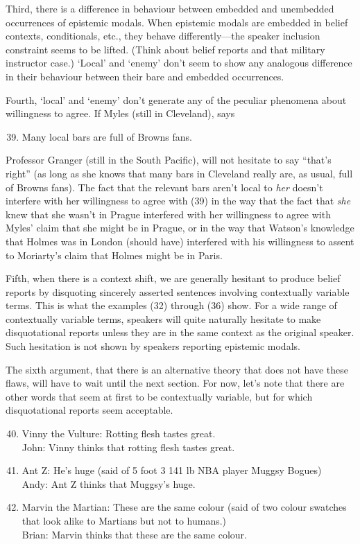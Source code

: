 Third, there is a difference in behaviour between embedded and unembedded occurrences of epistemic modals. When epistemic modals are embedded in belief contexts, conditionals, etc., they behave differently---the speaker inclusion constraint seems to be lifted. (Think about belief reports and that military instructor case.) `Local' and `enemy' don't seem to show any analogous difference in their behaviour between their bare and embedded occurrences.
 
Fourth, `local' and `enemy' don't generate any of the peculiar phenomena about willingness to agree. If Myles (still in Cleveland), says 
 
\begin{enumerate}
\setcounter{enumi}{38} 
\item Many local bars are full of Browns fans.
\end{enumerate}

\noindent Professor Granger (still in the South Pacific), will not hesitate to say ``that's right'' (as long as she knows that many bars in Cleveland really are, as usual, full of Browns fans). The fact that the relevant bars aren't local to \textit{her} doesn't interfere with her willingness to agree with (39) in the way that the fact that \textit{she} knew that she wasn't in Prague interfered with her willingness to agree with Myles' claim that she might be in Prague, or in the way that Watson's knowledge that Holmes was in London (should have) interfered with his willingness to assent to Moriarty's claim that Holmes might be in Paris. 
 
Fifth, when there is a context shift, we are generally hesitant to produce belief reports by disquoting sincerely asserted sentences involving contextually variable terms. This is what the examples (32) through (36) show. For a wide range of contextually variable terms, speakers will quite naturally hesitate to make disquotational reports unless they are in the same context as the original speaker. Such hesitation is not shown by speakers reporting epistemic modals.
 
The sixth argument, that there is an alternative theory that does not have these flaws, will have to wait until the next section. For now, let's note that there are other words that seem at first to be contextually variable, but for which disquotational reports seem acceptable.
 
\begin{enumerate}
\setcounter{enumi}{39} 
\item Vinny the Vulture: Rotting flesh tastes great. \\
John: Vinny thinks that rotting flesh tastes great. \\
\item Ant Z: He's huge (said of 5 foot 3 141 lb NBA player Muggsy Bogues) \\
Andy: Ant Z thinks that Muggsy's huge.\\
\item Marvin the Martian: These are the same colour (said of two colour swatches that look alike to Martians but not to humans.) \\
Brian: Marvin thinks that these are the same colour.
\end{enumerate}

